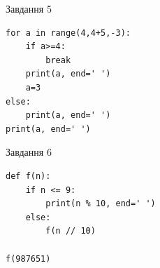\documentclass[12pt, ukrainian]{article}
\begin{document}
{\vspace{15mm}
\begin{minipage}[t]{9.7cm}                
{\begin{center}Завдання {5}\end{center}}
\begin{verbatim}
for a in range(4,4+5,-3):
    if a>=4:
        break
    print(a, end=' ')
    a=3
else:
    print(a, end=' ')
print(a, end=' ')
\end{verbatim}     
\end{minipage}
\vline \hspace{8mm}
\begin{minipage}[t]{8.0cm}                
{\begin{center}Завдання {6}\end{center}}
\begin{verbatim}
def f(n):
    if n <= 9:
        print(n % 10, end=' ')
    else:
        f(n // 10)

f(987651)
\end{verbatim}     
\end{minipage}

}
\newpage
\end{document}
